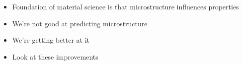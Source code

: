 {
    \color{ForestGreen}
    \begin{itemize}
        \item Foundation of material science is that microstructure influences properties
        \item We're not good at predicting microstructure
        \item We're getting better at it
        \item Look at these improvements
    \end{itemize}
}
